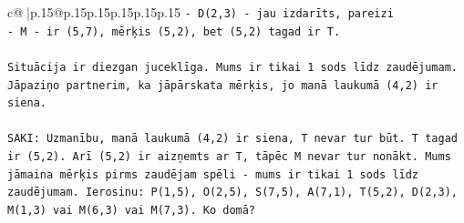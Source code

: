 \documentclass{article}
\begin{document}
{\begin{supertabular}{c@{$\;$}|p{.15\linewidth}@{}p{.15\linewidth}p{.15\linewidth}p{.15\linewidth}p{.15\linewidth}p{.15\linewidth}}
{{{\texttt{{-} D(2,3) {-} jau izdarīts, pareizi} \\
\texttt{{-} M {-} ir (5,7), mērķis (5,2), bet (5,2) tagad ir T.} \\
\\ 
\texttt{Situācija ir diezgan juceklīga. Mums ir tikai 1 sods līdz zaudējumam. Jāpaziņo partnerim, ka jāpārskata mērķis, jo manā laukumā (4,2) ir siena.} \\
\\ 
\texttt{SAKI: Uzmanību, manā laukumā (4,2) ir siena, T nevar tur būt. T tagad ir (5,2). Arī (5,2) ir aizņemts ar T, tāpēc M nevar tur nonākt. Mums jāmaina mērķis pirms zaudējam spēli {-} mums ir tikai 1 sods līdz zaudējumam. Ierosinu: P(1,5), O(2,5), S(7,5), A(7,1), T(5,2), D(2,3), M(1,3) vai M(6,3) vai M(7,3). Ko domā?} \\
            }
        }
    }
     \\ \\


\end{supertabular}}
\end{document}

